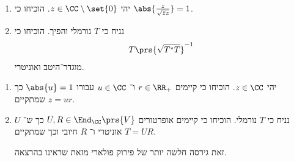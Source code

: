 \documentclass[a4paper,10pt,twoside,openany]{article}
\begin{document}
\begin{exercise}
\begin{enumerate}
\item יהי
$z \in \CC \setminus \set{0}$.
הוכיחו כי
$\abs{\frac{z}{\sqrt{\bar{z} z}}} = 1$.

\item נניח כי
$T$
נורמלי והפיך. הוכיחו כי
\begin{align*}
T \prs{\sqrt{T^* T}}^{-1}
\end{align*}
מוגדר־היטב ואוניטרי.
\end{enumerate}
\end{exercise}

\begin{exercise}
\begin{enumerate}
\item 
יהי
$z \in \CC$.
הוכיחו כי קיימים
$r \in \RR_+$
ו־%
$u \in \CC$
עבורו
$\abs{u} = 1$
כך שמתקיים
$z = ur$.

\item 
נניח כי
$T$
נורמלי. הוכיחו כי קיימים אופרטורים
$U,R \in \End_\CC\prs{V}$
כך ש־%
$U$
אוניטרי ו־%
$R$
חיובי וכך שמתקיים
$T = UR$.

זאת גירסה חלשה יותר של פירוק פולארי מזאת שראינו בהרצאה.
\end{enumerate}
\end{exercise}
\end{document}
